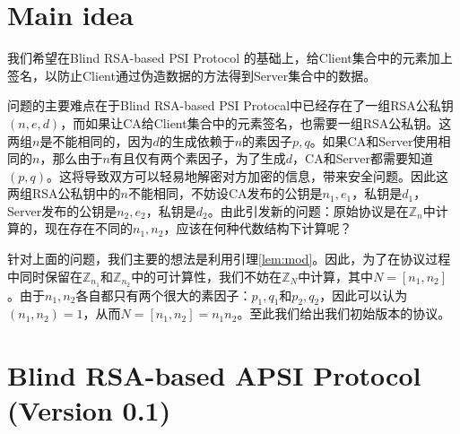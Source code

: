 \section{Main idea}
我们希望在Blind RSA-based PSI Protocol \cite{de2010practical}的基础上，给Client集合中的元素加上签名，以防止Client通过伪造数据的方法得到Server集合中的数据。

问题的主要难点在于Blind RSA-based PSI Protocal中已经存在了一组RSA公私钥$(n,e,d)$，而如果让CA给Client集合中的元素签名，也需要一组RSA公私钥。这两组$n$是不能相同的，因为$d$的生成依赖于$n$的素因子$p,q$。如果CA和Server使用相同的$n$，那么由于$n$有且仅有两个素因子，为了生成$d$，CA和Server都需要知道$(p,q)$。这将导致双方可以轻易地解密对方加密的信息，带来安全问题。因此这两组RSA公私钥中的$n$不能相同，不妨设CA发布的公钥是$n_1,e_1$，私钥是$d_1$，Server发布的公钥是$n_2,e_2$，私钥是$d_2$。由此引发新的问题：原始协议是在$\mathbb{Z}_n$中计算的，现在存在不同的$n_1,n_2$，应该在何种代数结构下计算呢？

针对上面的问题，我们主要的想法是利用引理\ref{lem:mod}。因此，为了在协议过程中同时保留在$\mathbb{Z}_{n_1}$和$\mathbb{Z}_{n_2}$中的可计算性，我们不妨在$\mathbb{Z}_N$中计算，其中$N=[n_1,n_2]$。由于$n_1,n_2$各自都只有两个很大的素因子：$p_1,q_1$和$p_2,q_2$，因此可以认为$(n_1,n_2)=1$，从而$N=[n_1,n_2]=n_1n_2$。至此我们给出我们初始版本的协议。

\section{Blind RSA-based APSI Protocol (Version 0.1)}

